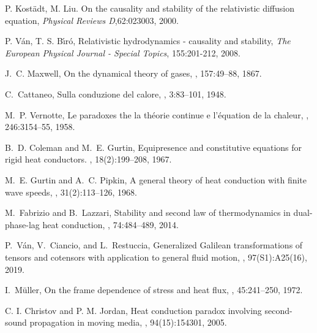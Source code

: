 \documentclass[sn-mathphys]{sn-jnl}%
\theoremstyle{thmstyleone}%
\theoremstyle{thmstyletwo}%
\theoremstyle{thmstylethree}%
\begin{document}
\begin{thebibliography}{9}
	P. Kost\"adt, M. Liu.
	On the causality and stability of the relativistic diffusion equation,
	{\em Physical Reviews D},62:023003, 2000.
	
	P. V\'an, T. S. B\'\i{}r\'o,
	Relativistic hydrodynamics - causality and stability, 
	{\em The European Physical Journal - Special Topics}, 155:201-212, 2008.
	
	J.~C. Maxwell,
	\newblock On the dynamical theory of gases,
	,
	157:49--88, 1867.
	
	C.~Cattaneo,
	\newblock Sulla conduzione del calore,
	, 3:83--101, 1948.
	
	M.~P. Vernotte,
	\newblock Le paradoxes the la th\'eorie continue e l'\'equation de la chaleur,
	, 246:3154--55, 1958.
	
	B.~D. Coleman and M.~E. Gurtin,
	\newblock Equipresence and constitutive equations for rigid heat conductors.
	,
	18(2):199--208, 1967.
	
	M.~E. Gurtin and A.~C. Pipkin,
	\newblock A general theory of heat conduction with finite wave speeds,
	, 31(2):113--126,
	1968.
	
	M.~Fabrizio and B.~Lazzari,
	\newblock Stability and second law of thermodynamics in dual-phase-lag heat
	conduction,
	, 74:484--489,
	2014.
	
	P.~V\'an, V.~Ciancio, and L.~Restuccia,
	\newblock Generalized {G}alilean transformations of tensors and cotensors with
	application to general fluid motion,
	, 97(S1):A25(16), 2019.
	
	I.~M\"uller,
	\newblock On the frame dependence of stress and heat flux,
	, 45:241--250, 1972.
	
	C. I. Christov and P. M. Jordan,
	\newblock Heat conduction paradox involving second-sound propagation in moving
	media,
	, 94(15):154301, 2005.
	

\end{thebibliography}
\end{document}
